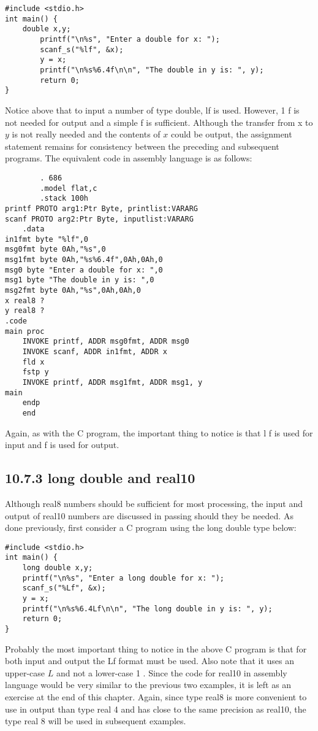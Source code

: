 \documentclass[10pt]{article}
\begin{document}
\begin{verbatim}
#include <stdio.h>
int main() {
    double x,y;
        printf("\n%s", "Enter a double for x: ");
        scanf_s("%lf", &x);
        y = x;
        printf("\n%s%6.4f\n\n", "The double in y is: ", y);
        return 0;
}
\end{verbatim}

Notice above that to input a number of type double, lf is used. However, 1 f is not needed for output and a simple f is sufficient. Although the transfer from x to $y$ is not really needed and the contents of $x$ could be output, the assignment statement remains for consistency between the preceding and subsequent programs. The equivalent code in assembly language is as follows:

\begin{verbatim}
        . 686
        .model flat,c
        .stack 100h
printf PROTO arg1:Ptr Byte, printlist:VARARG
scanf PROTO arg2:Ptr Byte, inputlist:VARARG
    .data
in1fmt byte "%lf",0
msg0fmt byte 0Ah,"%s",0
msg1fmt byte 0Ah,"%s%6.4f",0Ah,0Ah,0
msg0 byte "Enter a double for x: ",0
msg1 byte "The double in y is: ",0
msg2fmt byte 0Ah,"%s",0Ah,0Ah,0
x real8 ?
y real8 ?
.code
main proc
    INVOKE printf, ADDR msg0fmt, ADDR msg0
    INVOKE scanf, ADDR in1fmt, ADDR x
    fld x
    fstp y
    INVOKE printf, ADDR msg1fmt, ADDR msg1, y
main
    endp
    end
\end{verbatim}

Again, as with the C program, the important thing to notice is that l f is used for input and f is used for output.

\subsection*{10.7.3 long double and real10}
Although real8 numbers should be sufficient for most processing, the input and output of real10 numbers are discussed in passing should they be needed. As done previously, first consider a C program using the long double type below:

\begin{verbatim}
#include <stdio.h>
int main() {
    long double x,y;
    printf("\n%s", "Enter a long double for x: ");
    scanf_s("%Lf", &x);
    y = x;
    printf("\n%s%6.4Lf\n\n", "The long double in y is: ", y);
    return 0;
}
\end{verbatim}

Probably the most important thing to notice in the above C program is that for both input and output the Lf format must be used. Also note that it uses an upper-case $L$ and not a lower-case 1 . Since the code for real10 in assembly language would be very similar to the previous two examples, it is left as an exercise at the end of this chapter. Again, since type real8 is more convenient to use in output than type real 4 and has close to the same precision as real10, the type real 8 will be used in subsequent examples.
\end{document}
